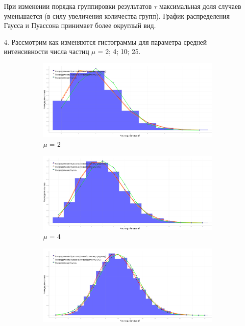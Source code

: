\documentclass[a4paper, 12pt]{article}
\begin{document}
При изменении порядка группировки результатов $\tau$ максимальная доля случаев уменьшается (в силу увеличения количества групп). График распределения Гаусса и Пуассона принимает более округлый вид.


4. Рассмотрим как изменяются гистограммы для параметра средней интенсивности числа частиц $\mu$ = 2; 4; 10; 25.
\begin{figure}[H]
\captionsetup[subfigure]{labelformat=empty}
\centering
\begin{subfigure}{.25\textwidth}
    \centering
    \includegraphics[width=1\linewidth]{m_2}
    \caption{$\mu$ = 2}
\end{subfigure}%
\begin{subfigure}{.25\textwidth}
    \centering
    \includegraphics[width=1\linewidth]{m_4}
    \caption{$\mu$ = 4}
\end{subfigure}%
\begin{subfigure}{.25\textwidth}
    \centering
    \includegraphics[width=1\linewidth]{m_10}

\end{subfigure}
\end{figure}
\end{document}
